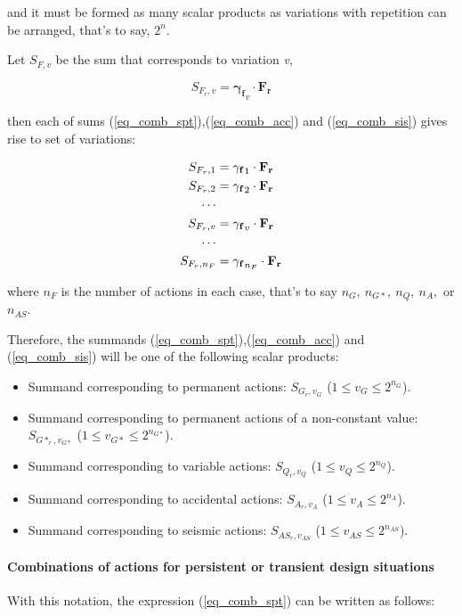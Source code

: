 \noindent and it must be formed as many scalar products as variations with repetition can be arranged, that's to say, $2^n$.

Let $S_{F,v}$ be the sum that corresponds to variation \emph{v},

\begin{equation}
S_{F_r,v}= \mathbf{\gamma_f}_v \cdot \mathbf{F_r}
\end{equation}

then each of sums (\ref{eq_comb_spt}),(\ref{eq_comb_acc}) and (\ref{eq_comb_sis}) gives rise to set of variations:

\begin{align} \notag
S_{F_r,1} &= \mathbf{\gamma_f}_1 \cdot \mathbf{F_r} \\ \notag
S_{F_r,2} &= \mathbf{\gamma_f}_2 \cdot \mathbf{F_r} \\ \notag
\cdots & \\ \notag
S_{F_r,v} &= \mathbf{\gamma_f}_v \cdot \mathbf{F_r}\\ \notag
\cdots & \\ \notag
S_{F_r,n_F} &= \mathbf{\gamma_f}_{n_F} \cdot \mathbf{F_r}
\end{align}

\noindent where $n_F$ is the number of actions in each case, that's to say $n_G,\ n_{G*},\ n_Q,\ n_A,$ or $n_{AS}$.

Therefore, the summands (\ref{eq_comb_spt}),(\ref{eq_comb_acc}) and (\ref{eq_comb_sis}) will be one of the following scalar products:

\begin{itemize}
\item Summand corresponding to permanent actions: $S_{G_r,v_G}$ ($1 \leq v_G \leq 2^{n_G}$).
\item Summand corresponding to permanent actions of a non-constant value: $S_{G*_r,v_{G*}}$ ($1 \leq v_{G*} \leq 2^{n_{G*}}$).
\item Summand corresponding to variable actions: $S_{Q_r,v_Q}$ ($1 \leq v_Q \leq 2^{n_Q}$). 
\item Summand corresponding to accidental actions: $S_{A_r,v_A}$ ($1 \leq v_A \leq 2^{n_A}$). 
\item Summand corresponding to seismic actions: $S_{AS_r,v_{AS}}$ ($1 \leq v_{AS} \leq 2^{n_{AS}}$).
\end{itemize}

\paragraph{Combinations of actions for persistent or transient design situations}
With this notation, the expression (\ref{eq_comb_spt}) can be written as follows:

